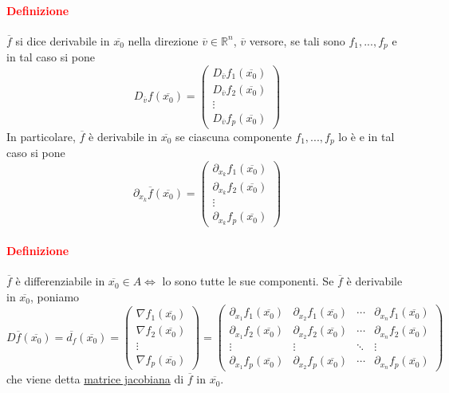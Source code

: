 \documentclass{article}
\newcommand{\R}{\mathbb{R}}
\begin{document}
\paragraph{\textcolor{red}{Definizione}}
$\overline{f}$ si dice derivabile in $\overline{x_0}$ nella direzione $\overline{v}\in \R^n$, $\overline{v}$ versore, se tali sono $f_1,...,f_p$ e in tal caso si pone
\begin{equation*}
    D_{\overline{v}}f(\overline{x_0})=\begin{pmatrix}
        D_{\overline{v}}f_1(\overline{x_0})\\
        D_{\overline{v}}f_2(\overline{x_0})\\
        \vdots\\
        D_{\overline{v}}f_p(\overline{x_0})
    \end{pmatrix}
\end{equation*}
In particolare, $\overline{f}$ è derivabile in $\overline{x_0}$ se ciascuna componente $f_1,...,f_p$ lo è e in tal caso si pone 
\begin{equation*}
    \partial_{x_k}\overline{f}(\overline{x_0})=\begin{pmatrix}
        \partial_{x_k}f_1(\overline{x_0})\\
        \partial_{x_k}f_2(\overline{x_0})\\
        \vdots\\
        \partial_{x_k}f_p(\overline{x_0})
    \end{pmatrix}
\end{equation*}

\paragraph{\textcolor{red}{Definizione}}
$\overline{f}$ è differenziabile in $\overline{x_0}\in A  \Leftrightarrow$ lo sono tutte le sue componenti. Se $\overline{f}$ è derivabile in $\overline{x_0}$, poniamo 
\begin{equation*}
    D\overline{f}(\overline{x_0})=\overline{d_f}(\overline{x_0})=\begin{pmatrix}
    \nabla f_1(\overline{x_0})\\
    \nabla f_2(\overline{x_0})\\
    \vdots\\
    \nabla f_p(\overline{x_0})
\end{pmatrix}=\begin{pmatrix}
    \partial_{x_1}f_1(\overline{x_0})&\partial_{x_2}f_1(\overline{x_0})&\cdots&\partial_{x_n}f_1(\overline{x_0})\\
    \partial_{x_1}f_2(\overline{x_0})&\partial_{x_2}f_2(\overline{x_0})&\cdots&\partial_{x_n}f_2(\overline{x_0})\\
    \vdots&\vdots&\ddots&\vdots \\
    \partial_{x_1}f_p(\overline{x_0})&\partial_{x_2}f_p(\overline{x_0})&\cdots&\partial_{x_n}f_p(\overline{x_0})
\end{pmatrix}
\end{equation*}
che viene detta \underline{matrice jacobiana} di $\overline{f}$ in $\overline{x_0}$.
\end{document}
